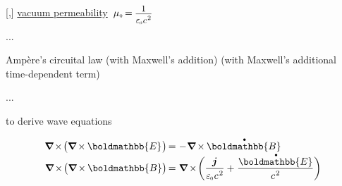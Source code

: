 [,] \href{https://en.wikipedia.org/wiki/Vacuum_permeability}{vacuum permeability}~${\vacuumpermeability \hspace{-0.2ex} = \hspace{-0.1ex} \smash{\scalebox{0.9}{$\displaystyle \frac{\raisemath{-0.16em}{1}}{\raisemath{-0.1em}{\vacuumpermittivity \hspace{.1ex} c^{\hspace{.16ex}2}}}$}}}$

...

Ampère’s circuital law (with Maxwell’s addition) (with Maxwell’s additional time-dependent term)

...

to derive wave equations

\nopagebreak\begin{equation*}
\begin{array}{r@{\hspace{.3em}}c@{\hspace{.3em}}l}
\boldnabla \hspace{-0.2ex} \times \hspace{-0.3ex} \bigl( \boldnabla \hspace{-0.15ex} \times \hspace{-0.1ex} \boldmathbb{E} \hspace{.1ex} \bigr) \hspace*{-0.3ex} &
= &
- \hspace{.1ex} \boldnabla \hspace{-0.15ex} \times \hspace{-0.1ex} \mathdotabove{\boldmathbb{B}}
\\[.1em]
\boldnabla \hspace{-0.2ex} \times \hspace{-0.3ex} \bigl( \boldnabla \hspace{-0.15ex} \times \hspace{-0.1ex} \boldmathbb{B} \bigr) \hspace*{-0.3ex} &
= &
\boldnabla \hspace{-0.12ex} \times \hspace{-0.33ex} \biggl( \displaystyle \frac{\bm{j}}{\raisemath{-0.1em}{ \vacuumpermittivity \hspace{.1ex} c^{\hspace{.16ex}2} }} + \hspace{.1ex} \displaystyle \frac{\raisemath{-0.12em}{ \mathdotabove{\boldmathbb{E}} }}{\raisemath{-0.1em}{ c^{\hspace{.16ex}2} }} \biggr)
\end{array}
\end{equation*}

